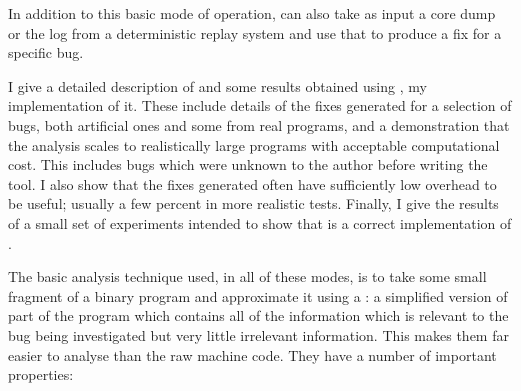 
In addition to this basic mode of operation, \technique{} can also
take as input a core dump or the log from a deterministic replay
system and use that to produce a fix for a specific bug.

I give a detailed description of \technique{} and some results
obtained using \implementation, my implementation of it.  These
include details of the fixes generated for a selection of bugs, both
artificial ones and some from real programs, and a demonstration that
the analysis scales to realistically large programs with acceptable
computational cost.  This includes bugs which were unknown to the
author before writing the tool.  I also show that the fixes
generated often have sufficiently low overhead to be useful; usually a
few percent in more realistic tests.  Finally, I give the results of a
small set of experiments intended to show that \implementation{} is a
correct implementation of \technique{}.

The basic analysis technique used, in all of these modes, is to take
some small fragment of a binary program and approximate it using a
\introduction{\StateMachine}: a simplified version of part of the program which contains
all of the information which is relevant to the bug being investigated
but very little irrelevant information.  This makes them far easier to
analyse than the raw machine code.  They have a number of important
properties:

